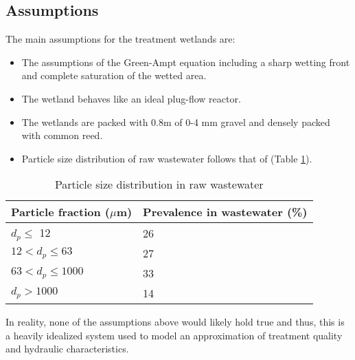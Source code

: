 \subsection{Assumptions}
The main assumptions for the treatment wetlands are:
\begin{itemize}
    \item The assumptions of the Green-Ampt equation including a sharp wetting front and complete saturation of the wetted area.
    \item The wetland behaves like an ideal plug-flow reactor.
    \item The wetlands are packed with 0.8m of 0-4 mm gravel and densely packed with common reed.
    \item Particle size distribution of raw wastewater follows that of \cite{particle_size_dist} (Table \ref{tab:particle_size_dist}).
\end{itemize}
\begin{table}[ht]
    \centering
    \begin{tabular}{l|l}
    Particle fraction ($\mu$m) & Prevalence in wastewater (\%)  \\
    \hline
    $d_p \leq$ 12 & 26 \\
    $12 < d_p \leq 63$ & 27 \\
    $63 < d_p \leq 1000$ & 33 \\
    $d_p > 1000$ & 14
    \end{tabular}
    \caption{Particle size distribution in raw wastewater}
    \label{tab:particle_size_dist}
\end{table}
In reality, none of the assumptions above would likely hold true and thus, this is a heavily idealized system used to model an approximation of treatment quality and hydraulic characteristics.
